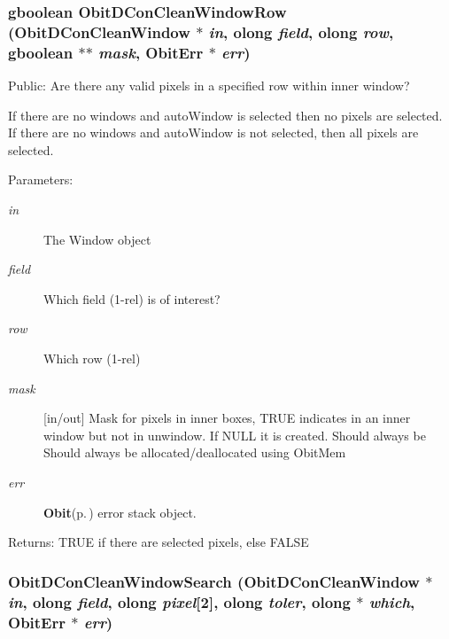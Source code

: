 \subsubsection{\setlength{\rightskip}{0pt plus 5cm}gboolean Obit\-DCon\-Clean\-Window\-Row ({\bf Obit\-DCon\-Clean\-Window} $\ast$ {\em in}, {\bf olong} {\em field}, {\bf olong} {\em row}, gboolean $\ast$$\ast$ {\em mask}, {\bf Obit\-Err} $\ast$ {\em err})}\label{ObitDConCleanWindow_8h_a39}


Public: Are there any valid pixels in a specified row within inner window? 

If there are no windows and auto\-Window is selected then no pixels are selected. If there are no windows and auto\-Window is not selected, then all pixels are selected. \begin{Desc}
\item[Parameters:]
\begin{description}
\item[{\em in}]The Window object \item[{\em field}]Which field (1-rel) is of interest? \item[{\em row}]Which row (1-rel) \item[{\em mask}][in/out] Mask for pixels in inner boxes, TRUE indicates in an inner window but not in unwindow. If NULL it is created. Should always be Should always be allocated/deallocated using Obit\-Mem \item[{\em err}]{\bf Obit}{\rm (p.\,\pageref{structObit})} error stack object. \end{description}
\end{Desc}
\begin{Desc}
\item[Returns:]TRUE if there are selected pixels, else FALSE \end{Desc}
\subsubsection{ Obit\-DCon\-Clean\-Window\-Search ({\bf Obit\-DCon\-Clean\-Window} $\ast$ {\em in}, {\bf olong} {\em field}, {\bf olong} {\em pixel}[2], {\bf olong} {\em toler}, {\bf olong} $\ast$ {\em which}, {\bf Obit\-Err} $\ast$ {\em err})}\label{ObitDConCleanWindow_8h_a33}


